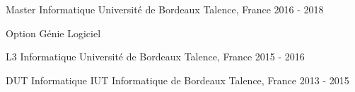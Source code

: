 \begin{cventries}
	\cventry
	{Master Informatique}
	{Université de Bordeaux}
	{Talence, France}
	{2016 - 2018}
	{
		\begin{cvitems}
			\item {Option Génie Logiciel}
		\end{cvitems}
	}

	\cventry
	{L3 Informatique}
	{Université de Bordeaux}
	{Talence, France}
	{2015 - 2016}
	{}

	\cventry
	{DUT Informatique}
	{IUT Informatique de Bordeaux}
	{Talence, France}
	{2013 - 2015}
	{}

\end{cventries}